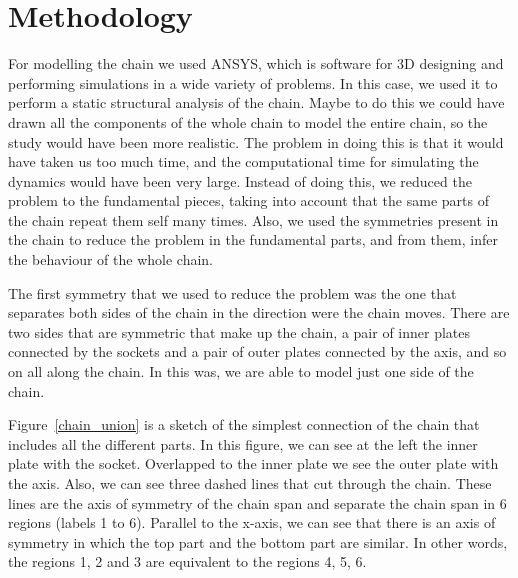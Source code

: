 \documentclass[a4paper 12pt]{article}
\begin{document}
\section{Methodology}

For modelling the chain we used ANSYS, which is software for 3D designing and performing simulations in a wide variety of problems. In this case, we used it to perform a static structural analysis of the chain. Maybe to do this we could have drawn all the components of the whole chain to model the entire chain, so the study would have been more realistic. The problem in doing this is that it would have taken us too much time, and the computational time for simulating the dynamics would have been very large. Instead of doing this, we reduced the problem to the fundamental pieces, taking into account that the same parts of the chain repeat them self many times. Also, we used the symmetries present in the chain to reduce the problem in the fundamental parts, and from them, infer the behaviour of the whole chain.

The first symmetry that we used to reduce the problem was the one that separates both sides of the chain in the direction were the chain moves. There are two sides that are symmetric that make up the chain, a pair of inner plates connected by the sockets and a pair of outer plates connected by the axis, and so on all along the chain. In this was, we are able to model just one side of the chain.

Figure~\ref{chain_union} is a sketch of the simplest connection of the chain that includes all the different parts. In this figure, we can see at the left the inner plate with the socket. Overlapped to the inner plate we see the outer plate with the axis. Also, we can see three dashed lines that cut through the chain. These lines are the axis of symmetry of the chain span and separate the chain span in 6 regions (labels 1 to 6). Parallel to the x-axis, we can see that there is an axis of symmetry in which the top part and the bottom part are similar. In other words, the regions 1, 2 and 3 are equivalent to the regions 4, 5, 6. 
\end{document}
